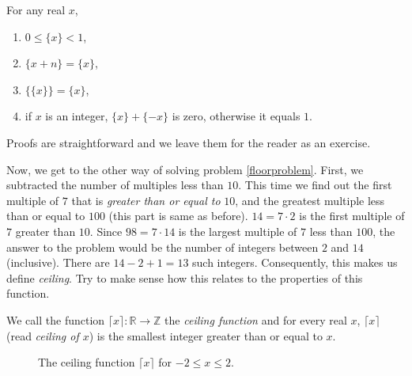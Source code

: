 \documentclass{subfile}
\begin{document}
\begin{proposition}
	For any real $x$,
	\begin{enumerate}[1.]
		\item $0\leq\{x\}<1$,
		\item  $\{ x+n\}=\{ x\}$,
		\item $\{\{x\}\} =  \{x\}$,
		\item if $x$ is an integer, $\{ x\}+\{ -x\}$ is zero, otherwise it equals $1$.
	\end{enumerate}
\end{proposition}

Proofs are straightforward and we leave them for the reader as an exercise.


Now, we get to the other way of solving problem \ref{floorproblem}. First, we subtracted the number of multiples less than $10$. This time we find out the first multiple of $7$ that is \textit{greater than or equal to} $10$, and the greatest multiple less than or equal to $100$ (this part is same as before). $14=7\cdot2$ is the first multiple of $7$ greater than $10$. Since $98=7\cdot14$ is the largest multiple of $7$ less than $100$, the answer to the problem would be the number of integers between $2$ and $14$ (inclusive). There are $14-2+1=13$ such integers. Consequently, this makes us define \textit{ceiling}. Try to make sense how this relates to the properties of this function.

\begin{definition}
	We call the function $\lceil x \rceil: \mathbb{R} \to \mathbb Z$ the \textit{ceiling function} and for every real $x$, $\lceil x\rceil$ (read \textit{ceiling of $x$}) is the smallest integer greater than or equal to $x$.

	\begin{figure}
		\centering
		\caption{The ceiling function $\lceil x \rceil$ for $-2 \leq x \leq 2$.}
		\label{fig:ceilingfunction}
	\end{figure}
\end{definition}
\end{document}

